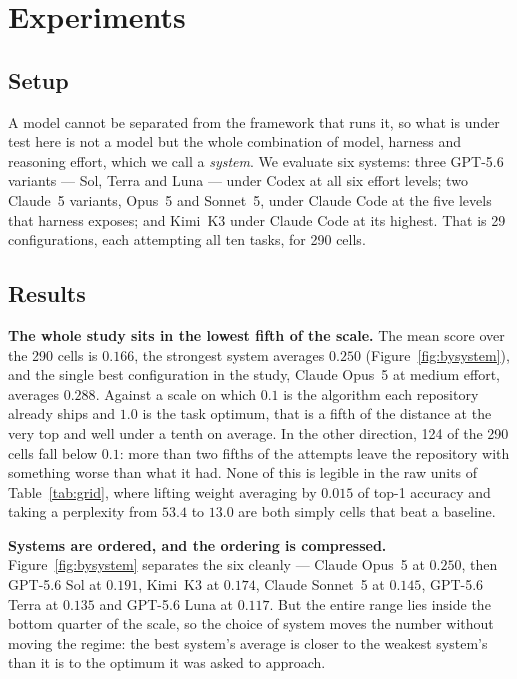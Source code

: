 \section{Experiments}
\label{sec:experiments}

\subsection{Setup}
\label{sec:setup}

A model cannot be separated from the framework that runs it, so what is under test here is not a
model but the whole combination of model, harness and reasoning effort, which we call a
\emph{system}. We evaluate six systems: three GPT-5.6 variants --- Sol, Terra and Luna --- under
Codex at all six effort levels; two Claude~5 variants, Opus~5 and Sonnet~5, under Claude Code at the
five levels that harness exposes; and Kimi~K3 under Claude Code at its highest. That is 29
configurations, each attempting all ten tasks, for 290 cells.

\subsection{Results}
\label{sec:results}

\textbf{The whole study sits in the lowest fifth of the scale.} The mean score over the 290 cells is
$0.166$, the strongest system averages $0.250$ (Figure~\ref{fig:bysystem}), and the single best
configuration in the study, Claude Opus~5 at medium effort, averages $0.288$. Against a scale on
which $0.1$ is the algorithm each repository already ships and $1.0$ is the task optimum, that is a
fifth of the distance at the very top and well under a tenth on average. In the other direction, 124
of the 290 cells fall below $0.1$: more than two fifths of the attempts leave the repository with
something worse than what it had. None of this is legible in the raw units of
Table~\ref{tab:grid}, where lifting weight averaging by $0.015$ of top-1 accuracy and taking a
perplexity from $53.4$ to $13.0$ are both simply cells that beat a baseline.

\textbf{Systems are ordered, and the ordering is compressed.} Figure~\ref{fig:bysystem} separates the
six cleanly --- Claude Opus~5 at $0.250$, then GPT-5.6 Sol at $0.191$, Kimi~K3 at $0.174$, Claude
Sonnet~5 at $0.145$, GPT-5.6 Terra at $0.135$ and GPT-5.6 Luna at $0.117$. But the entire range lies inside the bottom quarter of the scale, so the choice of
system moves the number without moving the regime: the best system's average is closer to the
weakest system's than it is to the optimum it was asked to approach.

